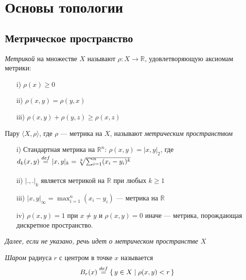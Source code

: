 \chapter{Основы топологии}

\section{Метрическое пространство}

\begin{definition}
    \textit{Метрикой} на множестве $X$ называют $\rho \colon X \to \mathbb{R}$,
    удовлетворяющую аксиомам метрики:
    \begin{itemize}
        \item[i)] $\rho(x) \geqslant 0$
        \item[ii)] $\rho(x, y) = \rho(y, x)$
        \item[iii)] $\rho(x, y) + \rho(y, z) \geqslant \rho(x, z)$
    \end{itemize}
\end{definition}

\begin{definition}
    Пару $\langle X, \rho \rangle$, где $\rho$ --- метрика на $X$, называют
    \textit{метрическим пространством}
\end{definition}

\begin{examples}
    \enewline
    \begin{itemize}
        \item[i)] Стандартная метрика на $\mathbb{R}^n$: $\rho(x, y) = |x, y|_2$,
        где $d_k(x, y) \overset{def}{\underset{}{=}} |x, y|_k = \sqrt[k]{\sum_{i=1}^{n}(x_i - y_i)^k}$
        \item[ii)] $|., .|_k$ является метрикой на $\mathbb{R}$ при любых $k
        \geqslant 1$
        \item[iii)] $|x, y|_{\infty} = \max_{i=1}^{n}(x_i - y_i)$ --- метрика
        на $\mathbb{R}$
        \item[iv)] $\rho(x, y) = 1$ при $x \neq y$ и $\rho(x, y) = 0$ иначе ---
        метрика, порождающая дискретное пространство.
    \end{itemize}
\end{examples}

\textit{Далее, если не указано, речь идет о метрическом пространстве $X$}

\begin{definition}
    \textit{Шаром} радиуса $r$ с центром в точке $x$ называется
\[
    B_r(x) \overset{def}{\underset{}{=}} \{\, y \in X \mid \rho(x, y) < r \,\}
\]
\end{definition}

